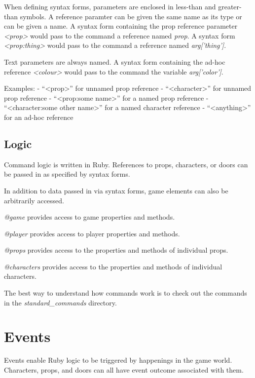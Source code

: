 \documentclass[letterpaper,10pt,english]{manual}
\begin{document}
When defining syntax forms, parameters are enclosed in less-than and greater-than symbols. A reference paramter can be given the same name as its type or can be given a name. A syntax form containing the prop reference parameter \emph{\textless{}prop\textgreater{}} would pass to the command a reference named \emph{prop}. A syntax form \emph{\textless{}prop:thing\textgreater{}} would pass to the command a reference named \emph{arg{[}'thing'{]}}.

Text parameters are always named. A syntax form containing the ad-hoc reference \emph{\textless{}colour\textgreater{}} would pass to the command the variable \emph{arg{[}'color'{]}}.

Examples:
- ``\textless{}prop\textgreater{}'' for unnamed prop reference
- ``\textless{}character\textgreater{}'' for unnamed prop reference
- ``\textless{}prop:some name\textgreater{}'' for a named prop reference
- ``\textless{}character:some other name\textgreater{}'' for a named character reference
- ``\textless{}anything\textgreater{}'' for an ad-hoc reference


\subsection{Logic}

Command logic is written in Ruby. References to props, characters, or doors can be passed in as specified by syntax forms.

In addition to data passed in via syntax forms, game elements can also be arbitrarily accessed.

\emph{@game} provides access to game properties and methods.

\emph{@player} provides access to player properties and methods.

\emph{@props} provides access to the properties and methods of individual props.

\emph{@characters} provides access to the properties and methods of individual characters.

The best way to understand how commands work is to check out the commands in the \emph{standard\_commands} directory.


\section{Events}

Events enable Ruby logic to be triggered by happenings in the game world. Characters, props, and doors can all have event outcome associated with them.
\end{document}
